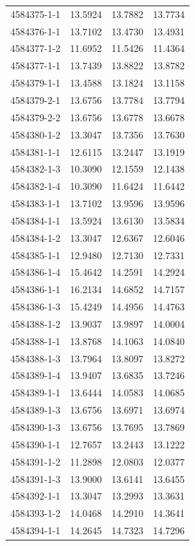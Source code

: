 \begin{longtable}{lrrr}
4584375-1-1 & 13.5924 & 13.7882 & 13.7734 \\
4584376-1-1 & 13.7102 & 13.4730 & 13.4931 \\
4584377-1-2 & 11.6952 & 11.5426 & 11.4364 \\
4584377-1-1 & 13.7439 & 13.8822 & 13.8782 \\
4584379-1-1 & 13.4588 & 13.1824 & 13.1158 \\
4584379-2-1 & 13.6756 & 13.7784 & 13.7794 \\
4584379-2-2 & 13.6756 & 13.6778 & 13.6678 \\
4584380-1-2 & 13.3047 & 13.7356 & 13.7630 \\
4584381-1-1 & 12.6115 & 13.2447 & 13.1919 \\
4584382-1-3 & 10.3090 & 12.1559 & 12.1438 \\
4584382-1-4 & 10.3090 & 11.6424 & 11.6442 \\
4584383-1-1 & 13.7102 & 13.9596 & 13.9596 \\
4584384-1-1 & 13.5924 & 13.6130 & 13.5834 \\
4584384-1-2 & 13.3047 & 12.6367 & 12.6046 \\
4584385-1-1 & 12.9480 & 12.7130 & 12.7331 \\
4584386-1-4 & 15.4642 & 14.2591 & 14.2924 \\
4584386-1-1 & 16.2134 & 14.6852 & 14.7157 \\
4584386-1-3 & 15.4249 & 14.4956 & 14.4763 \\
4584388-1-2 & 13.9037 & 13.9897 & 14.0004 \\
4584388-1-1 & 13.8768 & 14.1063 & 14.0840 \\
4584388-1-3 & 13.7964 & 13.8097 & 13.8272 \\
4584389-1-4 & 13.9407 & 13.6835 & 13.7246 \\
4584389-1-1 & 13.6444 & 14.0583 & 14.0685 \\
4584389-1-3 & 13.6756 & 13.6971 & 13.6974 \\
4584390-1-3 & 13.6756 & 13.7695 & 13.7869 \\
4584390-1-1 & 12.7657 & 13.2443 & 13.1222 \\
4584391-1-2 & 11.2898 & 12.0803 & 12.0377 \\
4584391-1-3 & 13.9000 & 13.6141 & 13.6455 \\
4584392-1-1 & 13.3047 & 13.2993 & 13.3631 \\
4584393-1-2 & 14.0468 & 14.2910 & 14.3641 \\
4584394-1-1 & 14.2645 & 14.7323 & 14.7296 \\

\end{longtable}

